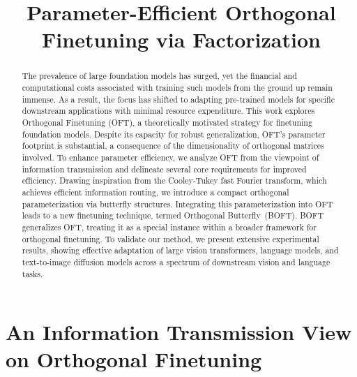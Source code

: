 \title{Parameter-Efficient Orthogonal Finetuning via Factorization}

\begin{abstract}
The prevalence of large foundation models has surged, yet the financial and computational costs associated with training such models from the ground up remain immense. As a result, the focus has shifted to adapting pre-trained models for specific downstream applications with minimal resource expenditure. This work explores Orthogonal Finetuning (OFT), a theoretically motivated strategy for finetuning foundation models. Despite its capacity for robust generalization, OFT’s parameter footprint is substantial, a consequence of the dimensionality of orthogonal matrices involved. To enhance parameter efficiency, we analyze OFT from the viewpoint of information transmission and delineate several core requirements for improved efficiency. Drawing inspiration from the Cooley-Tukey fast Fourier transform, which achieves efficient information routing, we introduce a compact orthogonal parameterization via butterfly structures. Integrating this parameterization into OFT leads to a new finetuning technique, termed Orthogonal Butterfly~(BOFT). BOFT generalizes OFT, treating it as a special instance within a broader framework for orthogonal finetuning. To validate our method, we present extensive experimental results, showing effective adaptation of large vision transformers, language models, and text-to-image diffusion models across a spectrum of downstream vision and language tasks.
\end{abstract}

\section{An Information Transmission View on Orthogonal Finetuning}

